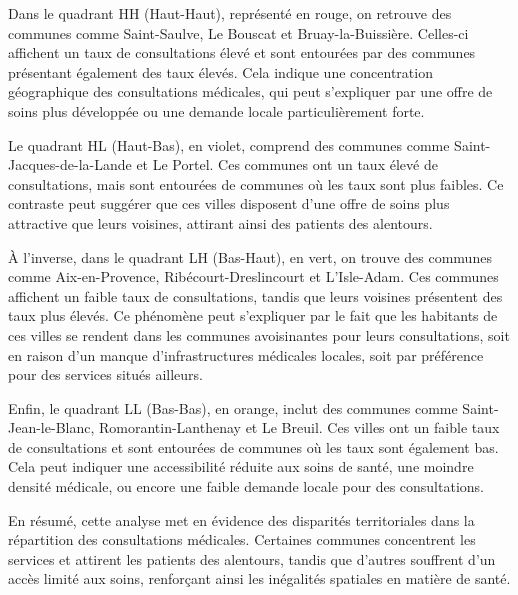 \documentclass[
]{article}
\begin{document}
Dans le quadrant HH (Haut-Haut), représenté en rouge, on retrouve des
communes comme Saint-Saulve, Le Bouscat et Bruay-la-Buissière. Celles-ci
affichent un taux de consultations élevé et sont entourées par des
communes présentant également des taux élevés. Cela indique une
concentration géographique des consultations médicales, qui peut
s'expliquer par une offre de soins plus développée ou une demande locale
particulièrement forte.

Le quadrant HL (Haut-Bas), en violet, comprend des communes comme
Saint-Jacques-de-la-Lande et Le Portel. Ces communes ont un taux élevé
de consultations, mais sont entourées de communes où les taux sont plus
faibles. Ce contraste peut suggérer que ces villes disposent d'une offre
de soins plus attractive que leurs voisines, attirant ainsi des patients
des alentours.

À l'inverse, dans le quadrant LH (Bas-Haut), en vert, on trouve des
communes comme Aix-en-Provence, Ribécourt-Dreslincourt et L'Isle-Adam.
Ces communes affichent un faible taux de consultations, tandis que leurs
voisines présentent des taux plus élevés. Ce phénomène peut s'expliquer
par le fait que les habitants de ces villes se rendent dans les communes
avoisinantes pour leurs consultations, soit en raison d'un manque
d'infrastructures médicales locales, soit par préférence pour des
services situés ailleurs.

Enfin, le quadrant LL (Bas-Bas), en orange, inclut des communes comme
Saint-Jean-le-Blanc, Romorantin-Lanthenay et Le Breuil. Ces villes ont
un faible taux de consultations et sont entourées de communes où les
taux sont également bas. Cela peut indiquer une accessibilité réduite
aux soins de santé, une moindre densité médicale, ou encore une faible
demande locale pour des consultations.

En résumé, cette analyse met en évidence des disparités territoriales
dans la répartition des consultations médicales. Certaines communes
concentrent les services et attirent les patients des alentours, tandis
que d'autres souffrent d'un accès limité aux soins, renforçant ainsi les
inégalités spatiales en matière de santé.
\end{document}

